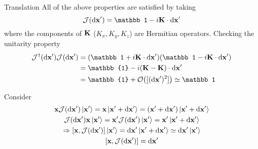 \begin{frame}{Translation}
	All of the above properties are satisfied by taking
	\[
		\mathcal{J}(\dd{\vb x'}) = \mathbb 1 - i\vb{K} \cdot \dd{\vb x'}
	\]
	where the components of $\vb K$ ($K_x, K_y, K_z$) are Hermitian operators.
	Checking the unitarity property
	\begin{align*}
		\mathcal{J}^\dag(\dd{\vb x'}) \mathcal{J}(\dd{\vb x'}) & = (\mathbb 1 + i\vb K \cdot  \dd{\vb x'})(\mathbb 1 - i\vb K \cdot  \dd{\vb x'}) \\
		                                                       & = \mathbb{1} - i(\vb K - \vb K)\cdot \dd{\vb x'}                                 \\
		                                                       & = \mathbb{1} + \order{[(\dd{\vb x'})^2]} \simeq \mathbb 1
	\end{align*}

	Consider
	\begin{gather*}
		\vb x \mathcal{J}(\dd{\vb x'})\ket{\vb x'} = \vb x	\ket{\vb x' + \dd{\vb x'}} = (\vb x' + \dd{\vb x'})\ket{\vb x' + \dd{\vb x'}}\\
		\mathcal{J}(\dd{\vb x'}) \vb x \ket{\vb x'} = \vb x' \mathcal{J}(\dd{\vb x'}) \ket{\vb x'} = \vb x' \ket{\vb x' + \dd{\vb x'}}\\
		\Rightarrow \comm{\vb x}{\mathcal{J}(\dd{\vb x'})} \ket{\vb x'} = \dd{\vb x'} \ket{\vb x' + \dd{\vb x'}} \simeq \dd{\vb x'} \ket{\vb x'}\\
		\comm{\vb x}{\mathcal{J}(\dd{\vb x'})}  = \dd{\vb x'}
	\end{gather*}

\end{frame}
